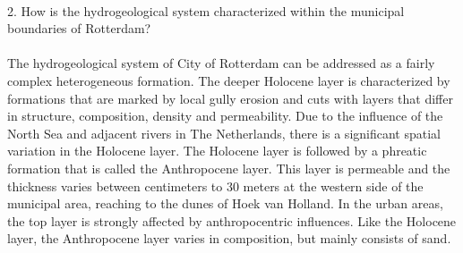 \\
2. How is the hydrogeological system characterized within the municipal boundaries of Rotterdam? \\
\\
\noindent
The hydrogeological system of City of Rotterdam can be addressed as a fairly complex heterogeneous formation. The deeper Holocene layer is characterized by formations that are marked by local gully erosion and cuts with layers that differ in structure, composition, density and permeability. Due to the influence of the North Sea and adjacent rivers in The Netherlands, there is a significant spatial variation in the Holocene layer. The Holocene layer is followed by a phreatic formation that is called the Anthropocene layer. This layer is permeable and the thickness varies between centimeters to 30 meters at the western side of the municipal area, reaching to the dunes of Hoek van Holland. In the urban areas, the top layer is strongly affected by anthropocentric influences. Like the Holocene layer, the Anthropocene layer varies in composition, but mainly consists of sand. 

